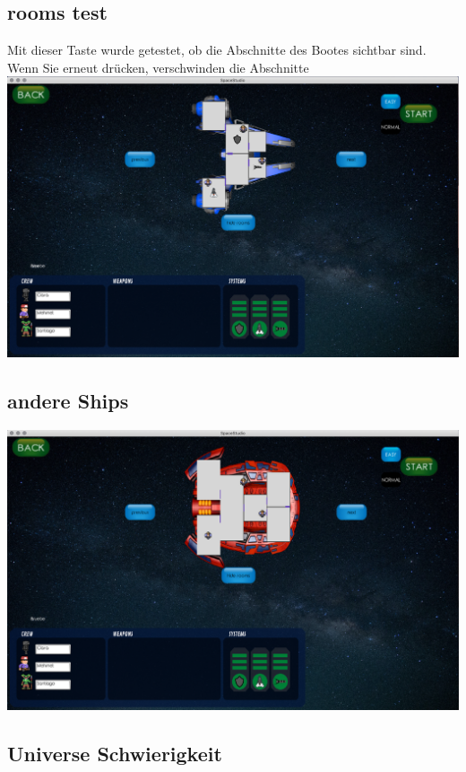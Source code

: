\documentclass[11pt]{article}
\begin{document}
\subsection{rooms test}

Mit dieser Taste wurde getestet, ob die Abschnitte des Bootes sichtbar sind. Wenn Sie erneut drücken, verschwinden die Abschnitte\\
\includegraphics[scale=0.2]{TestProtocolBilder/shipRooms.png}
\subsection{andere Ships}
\includegraphics[scale=0.2]{TestProtocolBilder/next.png}
\subsection{Universe Schwierigkeit}
\end{document}
